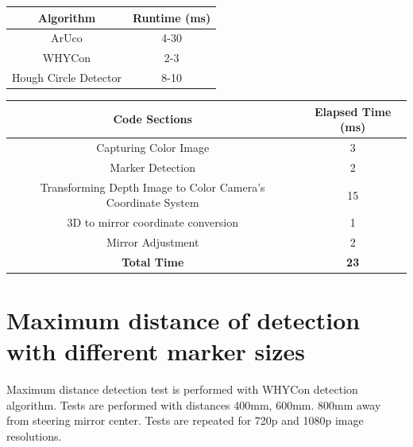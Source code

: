 \begin{table}[ht]
    \centering
    \begin{tabular}{| c | c |} %
        \hline Algorithm      & Runtime (ms) \\ \hline %
        ArUco                 & 4-30         \\
        WHYCon                & 2-3          \\
        Hough Circle Detector & 8-10         \\
        \hline
    \end{tabular}
    \label{tab:detection_algorithm_performance}
\end{table}


\begin{table}[ht]
    \centering
    \begin{tabular}{| c | c |} %
        \hline Code Sections                                         & Elapsed Time (ms) \\ \hline %
        Capturing Color Image                                        & 3                 \\
        Marker Detection                                             & 2                 \\
        Transforming Depth Image to Color Camera's Coordinate System & 15                \\
        3D to mirror coordinate conversion                           & 1                 \\
        Mirror Adjustment                                            & 2                 \\
        \textbf{Total Time}                                          & \textbf{23}       \\
        \hline
    \end{tabular}
    \label{tab:code_runtime}
\end{table}


\section{Maximum distance of detection with different marker sizes}

Maximum distance detection test is performed with WHYCon
detection algorithm. Tests are performed with distances 400mm,
600mm. 800mm away from steering mirror center. Tests are repeated
for 720p and 1080p image resolutions.


